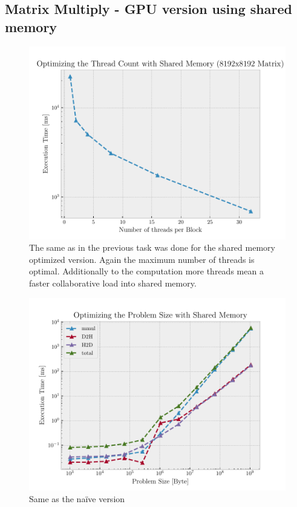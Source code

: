 \documentclass[12pt]{article}
\begin{document}
\newpage
\subsection{Matrix Multiply - GPU version using shared memory}

\begin{figure}[htpb]
	\centering
	\includegraphics[width=1\linewidth]{../eval/sh_thread_count.pdf}
	\caption{The same as in the previous task was done for the shared memory
	optimized version. Again the maximum number of threads is optimal.
Additionally to the computation more threads mean a faster collaborative
load into shared memory.}%
	\label{fig:../eval/sh_thread_count}
\end{figure}

\begin{figure}[htpb]
	\centering
	\includegraphics[width=1\linewidth]{../eval/sh_problem_size.pdf}
	\caption{Same as the naïve version}%
	\label{fig:../eval/sh_problem_size}
\end{figure}
\end{document}
